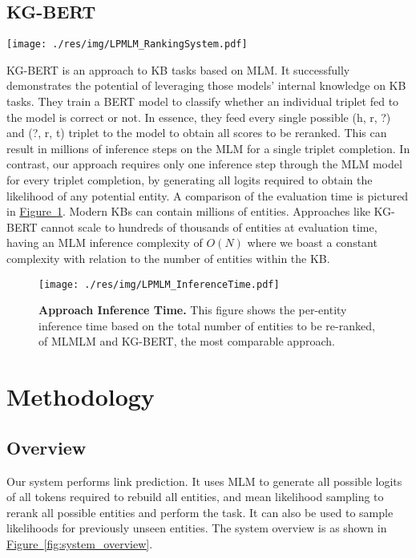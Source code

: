\documentclass[11pt,a4paper]{article}
\newcommand{\RefFigure}[1]{\hyperref[#1]{Figure~\ref{#1}}}
\newcommand{\Figure}[4]{\begin{figure}[H]
    \centering
    #1
    \captionsetup{
        labelfont=bf,
        justification=raggedright,
        singlelinecheck=off,
        width=.95\linewidth}
    \caption{\textbf{#3.} #4}
    \label{#2}
\end{figure}}
\newcommand{\FigureW}[4]{\begin{figure*}[h!]
    \centering
    #1
    \captionsetup{
        labelfont=bf,
        justification=raggedright,
        singlelinecheck=off,
        width=.95\linewidth}
    \caption{\textbf{#3.} #4}
    \label{#2}
\end{figure*}}
\begin{document}
\subsection{KG-BERT}
\FigureW
{\texttt{[image: ./res/img/LPMLM\_RankingSystem.pdf]}}
{fig:ranking_system}
{Ranking System}
{The figure details the inner workings of the ranking system which uses the lookup table generated by the masked language model to compute the score associated with each possible entity.
The scored entities are then ranked by highest score. \vspace{-.5em}}



KG-BERT is an approach to KB tasks based on MLM.
It successfully demonstrates the potential of leveraging those models' internal knowledge on KB tasks.
They train a BERT model to classify whether an individual triplet fed to the model is correct or not. 
In essence, they feed every single possible (h, r, ?) and (?, r, t) triplet to the model to obtain all scores to be reranked.
This can result in millions of inference steps on the MLM for a single triplet completion.
In contrast, our approach requires only one inference step through the MLM model for every triplet completion, by generating all logits required to obtain the likelihood of any potential entity. 
A comparison of the evaluation time is pictured in \RefFigure{fig:inference_time}.
Modern KBs can contain millions of entities.
Approaches like KG-BERT cannot scale to hundreds of thousands of entities at evaluation time, having an MLM inference complexity of $O(N)$ where we boast a constant complexity with relation to the number of entities within the KB.

\vspace{-1em}

\Figure
{\texttt{[image: ./res/img/LPMLM\_InferenceTime.pdf]}}
{fig:inference_time}
{Approach Inference Time}
{This figure shows the per-entity inference time based on the total number of entities to be re-ranked, of MLMLM and KG-BERT, the most comparable approach. \vspace{-1.5em}}


\section{Methodology}


\subsection{Overview}
Our system performs link prediction.
It uses MLM to generate all possible logits of all tokens required to rebuild all entities, and mean likelihood sampling to rerank all possible entities and perform the task.
It can also be used to sample likelihoods for previously unseen entities.
The system overview is as shown in \RefFigure{fig:system_overview}. 
\end{document}
